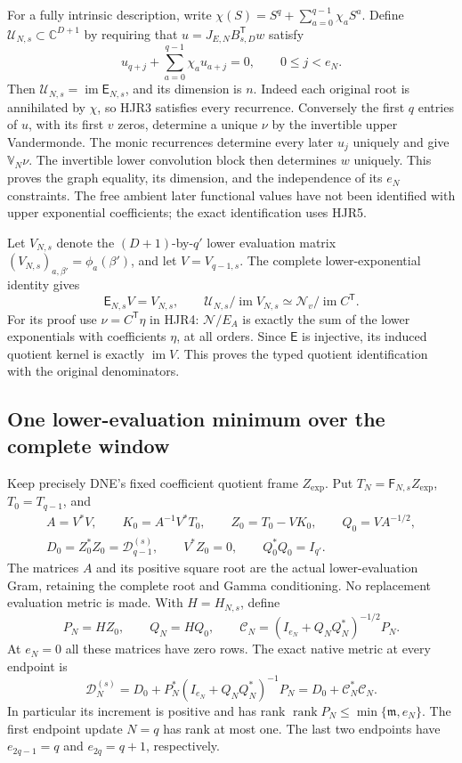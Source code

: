 \documentclass[11pt,a4paper]{article}
\begin{document}
For a fully intrinsic description, write
$\chi(S)=S^q+\sum_{a=0}^{q-1}\chi_aS^a$. Define
$\mathcal U_{N,s}\subset\mathbb C^{D+1}$ by requiring that
$u=J_{E,N}B_{s,D}^{\mathsf T}w$ satisfy
\[
 u_{q+j}+\sum_{a=0}^{q-1}\chi_a u_{a+j}=0,
                      \qquad 0\le j<e_N .
 \tag{HJR5}
\]
Then $\mathcal U_{N,s}=\operatorname{im}\mathsf E_{N,s}$,
and its dimension is $n$. Indeed each original root is
annihilated by $\chi$, so HJR3 satisfies every recurrence.
Conversely the first $q$ entries of $u$, with its first $v$
zeros, determine a unique $\nu$ by the invertible upper
Vandermonde. The monic recurrences determine every later
$u_j$ uniquely and give $\mathbb V_N\nu$. The invertible
lower convolution block then determines $w$ uniquely.
This proves the graph equality, its dimension, and the
independence of its $e_N$ constraints. The free ambient later
functional values have not been identified with upper
exponential coefficients; the exact identification uses HJR5.

Let $V_{N,s}$ denote the $(D+1)$-by-$q'$ lower evaluation matrix
$(V_{N,s})_{a,\beta'}=\phi_a(\beta')$, and let $V=V_{q-1,s}$.
The complete lower-exponential identity gives
\[
 \mathsf E_{N,s}V=V_{N,s},\qquad
 \mathcal U_{N,s}/\operatorname{im}V_{N,s}
       \simeq\mathscr N_v/\operatorname{im}C^{\mathsf T}.
 \tag{HJR6}
\]
For its proof use $\nu=C^{\mathsf T}\eta$ in HJR4:
$\mathcal N/E_A$ is exactly the sum of the lower exponentials
with coefficients $\eta$, at all orders. Since $\mathsf E$
is injective, its induced quotient kernel is exactly
$\operatorname{im}V$. This proves the typed quotient
identification with the original denominators.

\subsection{One lower-evaluation minimum over the complete window}

Keep precisely DNE's fixed coefficient quotient frame $Z_{\exp}$.
Put $T_N=\mathsf F_{N,s}Z_{\exp}$, $T_0=T_{q-1}$, and
\[
 \begin{gathered}
 A=V^*V,\qquad K_0=A^{-1}V^*T_0,\qquad
 Z_0=T_0-VK_0,\qquad Q_0=VA^{-1/2},\\
 D_0=Z_0^*Z_0=\mathcal D_{q-1}^{(s)},\qquad
 V^*Z_0=0,\qquad Q_0^*Q_0=I_{q'}.
 \end{gathered}\tag{HJR7}
\]
The matrices $A$ and its positive square root are the actual
lower-evaluation Gram, retaining the complete root and Gamma
conditioning. No replacement evaluation metric is made.
With $H=H_{N,s}$, define
\[
 P_N=HZ_0,\qquad Q_N=HQ_0,\qquad
 \mathcal C_N=(I_{e_N}+Q_NQ_N^*)^{-1/2}P_N .
 \tag{HJR8}
\]
At $e_N=0$ all these matrices have zero rows. The exact native
metric at every endpoint is
\[
 \boxed{\quad
 \mathcal D_N^{(s)}
   =D_0+P_N^*(I_{e_N}+Q_NQ_N^*)^{-1}P_N
   =D_0+\mathcal C_N^*\mathcal C_N .
 \quad}\tag{HJR9}
\]
In particular its increment is positive and has rank
$\operatorname{rank}P_N\le\min\{\mathfrak m,e_N\}$.
The first endpoint update $N=q$ has rank at most one.
The last two endpoints have $e_{2q-1}=q$ and $e_{2q}=q+1$, respectively.
\end{document}
